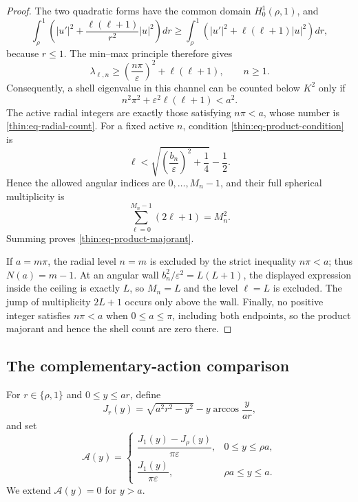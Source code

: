 \documentclass[11pt]{article}
\numberwithin{equation}{section}
\theoremstyle{definition}
\theoremstyle{remark}
\begin{document}
\begin{proof}
The two quadratic forms have the common domain \(H_0^1(\rho,1)\), and
\[
  \int_\rho^1\left(
     |u'|^2+\frac{\ell(\ell+1)}{r^2}|u|^2
  \right)dr
  \geq
  \int_\rho^1\left(|u'|^2+\ell(\ell+1)|u|^2\right)dr,
\]
because \(r\leq1\).  The min--max principle therefore gives
\[
  \lambda_{\ell,n}
  \geq \left(\frac{n\pi}{\varepsilon}\right)^2
       +\ell(\ell+1),
  \qquad n\geq1.
\]
Consequently, a shell eigenvalue in this channel can be counted below
\(K^2\) only if
\begin{equation}
  n^2\pi^2+\varepsilon^2\ell(\ell+1)<a^2.
  \label{thin:eq-product-condition}
\end{equation}
The active radial integers are exactly those satisfying \(n\pi<a\), whose
number is \eqref{thin:eq-radial-count}.  For a fixed active \(n\), condition
\eqref{thin:eq-product-condition} is
\[
  \ell<
  \sqrt{\left(\frac{b_n}{\varepsilon}\right)^2+\frac14}-\frac12.
\]
Hence the allowed angular indices are
\(0,\ldots,M_n-1\), and their full spherical multiplicity is
\[
  \sum_{\ell=0}^{M_n-1}(2\ell+1)=M_n^2.
\]
Summing proves \eqref{thin:eq-product-majorant}.

If \(a=m\pi\), the radial level \(n=m\) is excluded by the strict
inequality \(n\pi<a\); thus \(N(a)=m-1\).  At an angular wall
\(b_n^2/\varepsilon^2=L(L+1)\), the displayed expression inside the ceiling
is exactly \(L\), so \(M_n=L\) and the level \(\ell=L\) is excluded.  The
jump of multiplicity \(2L+1\) occurs only above the wall.  Finally, no
positive integer satisfies \(n\pi<a\) when \(0\leq a\leq\pi\), including
both endpoints, so the product majorant and hence the shell count are zero
there.
\end{proof}


\subsection{The complementary-action comparison}

For \(r\in\{\rho,1\}\) and \(0\leq y\leq ar\), define
\begin{equation}
  J_r(y)=\sqrt{a^2r^2-y^2}
          -y\arccos\frac{y}{ar},
  \label{thin:eq-J-action}
\end{equation}
and set
\begin{equation}
  \mathcal A(y)=
  \begin{cases}
  \dfrac{J_1(y)-J_\rho(y)}{\pi\varepsilon},
    &0\leq y\leq\rho a,\\[6pt]
  \dfrac{J_1(y)}{\pi\varepsilon},
    &\rho a\leq y\leq a.
  \end{cases}
  \label{thin:eq-action-definition}
\end{equation}
We extend \(\mathcal A(y)=0\) for \(y>a\).
\end{document}
